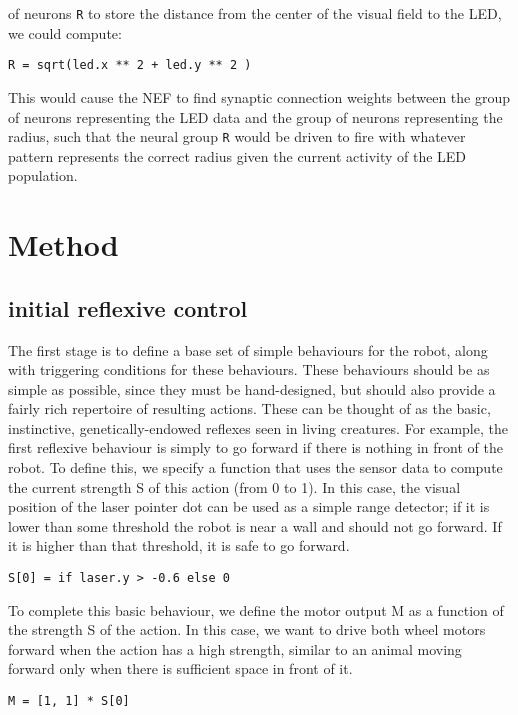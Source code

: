 \documentclass[conference]{IEEEtran}
\begin{document}
of neurons \texttt{R} to store the distance from the center of the visual field to the LED, we could compute: 
\begin{lstlisting}
R = sqrt(led.x ** 2 + led.y ** 2 )
\end{lstlisting}

This would cause the NEF to find synaptic connection weights between the group of neurons representing the LED data and the group of neurons representing the radius, such that the neural group \texttt{R} would be driven to fire with whatever pattern represents the correct radius given the
current activity of the LED population.

\section{Method}
\subsection{initial reflexive control}
The first stage is to define a base set of simple behaviours for the robot, along with triggering conditions for these behaviours. These behaviours should be as simple as possible, since they must be hand-designed, but should also provide a fairly rich repertoire of resulting actions. These can be thought of as the basic, instinctive, genetically-endowed reflexes seen in living creatures. For example, the first reflexive behaviour is simply to go forward if there is nothing in front of the robot. To define this, we specify a function that uses the sensor data to compute the current strength S of this action (from 0 to 1). In this case, the visual position of the laser pointer dot can be used as a simple range detector; if it is lower than some threshold the robot is near a wall and should not go forward. If it is higher than that threshold, it is safe to go forward. 
\begin{lstlisting}
S[0] = if laser.y > -0.6 else 0
\end{lstlisting}

To complete this basic behaviour, we define the motor output M as a function of the strength S of the action. In this case, we want to drive both wheel motors forward when the action has a high strength, similar to an animal moving forward only when there is sufficient space in front of it.

\begin{lstlisting}
M = [1, 1] * S[0]
\end{lstlisting}
\end{document}

